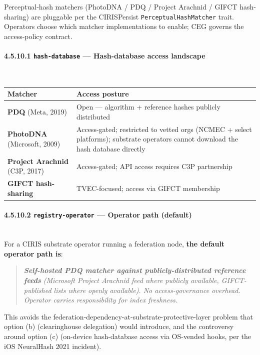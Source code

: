 \documentclass[11pt]{article}
\begin{document}
Perceptual-hash matchers (PhotoDNA / PDQ / Project Arachnid / GIFCT hash-sharing) are pluggable per the CIRISPersist \texttt{PerceptualHashMatcher} trait. Operators choose which matcher implementations to enable; CEG governs the access-policy contract.


\paragraph{4.5.10.1 \texttt{hash-database} — Hash-database access landscape}\mbox{}\\


{\footnotesize
\begin{longtable}{|p{8.0cm}|p{8.0cm}|}\hline
\textbf{Matcher} & \textbf{Access posture} \\ \hline\endhead
\textbf{PDQ} (Meta, 2019) & Open — algorithm + reference hashes publicly distributed \\ \hline
\textbf{PhotoDNA} (Microsoft, 2009) & Access-gated; restricted to vetted orgs (NCMEC + select platforms); substrate operators cannot download the hash database directly \\ \hline
\textbf{Project Arachnid} (C3P, 2017) & Access-gated; API access requires C3P partnership \\ \hline
\textbf{GIFCT hash-sharing} & TVEC-focused; access via GIFCT membership \\ \hline
\end{longtable}}


\paragraph{4.5.10.2 \texttt{registry-operator} — Operator path (default)}\mbox{}\\


For a CIRIS substrate operator running a federation node, \textbf{the default operator path is}:


\begin{quote}\itshape \textbf{Self-hosted PDQ matcher against publicly-distributed reference feeds} (Microsoft Project Arachnid feed where publicly available, GIFCT-published lists where openly available). No access-governance overhead. Operator carries responsibility for index freshness.\end{quote}


This avoids the federation-dependency-at-substrate-protective-layer problem that option (b) (clearinghouse delegation) would introduce, and the controversy around option (c) (on-device hash-database access via OS-vended hooks, per the iOS NeuralHash 2021 incident).
\end{document}
